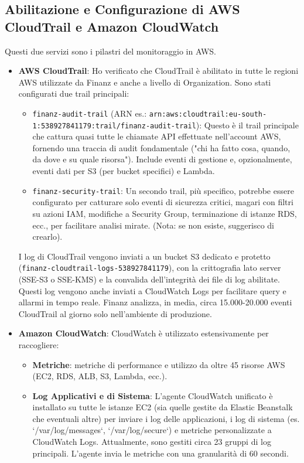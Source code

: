 \subsection{Abilitazione e Configurazione di AWS CloudTrail e Amazon CloudWatch}
\label{subsec:cloudtrail-cloudwatch-enable_cap2}
Questi due servizi sono i pilastri del monitoraggio in AWS.
\begin{itemize}
    \item \textbf{AWS CloudTrail}: Ho verificato che CloudTrail è abilitato in tutte le regioni AWS utilizzate da Finanz e anche a livello di Organization. Sono stati configurati due trail principali:
        \begin{itemize}
            \item \texttt{finanz-audit-trail} (ARN es.: \texttt{arn:aws:cloudtrail:eu-south-1:538927841179:trail/finanz-audit-trail}): Questo è il trail principale che cattura quasi tutte le chiamate API effettuate nell'account AWS, fornendo una traccia di audit fondamentale ("chi ha fatto cosa, quando, da dove e su quale risorsa"). Include eventi di gestione e, opzionalmente, eventi dati per S3 (per bucket specifici) e Lambda.
            \item \texttt{finanz-security-trail}: Un secondo trail, più specifico, potrebbe essere configurato per catturare solo eventi di sicurezza critici, magari con filtri su azioni IAM, modifiche a Security Group, terminazione di istanze RDS, ecc., per facilitare analisi mirate. (Nota: se non esiste, suggerisco di crearlo).
        \end{itemize}
        I log di CloudTrail vengono inviati a un bucket S3 dedicato e protetto (\texttt{finanz-cloudtrail-logs-538927841179}), con la crittografia lato server (SSE-S3 o SSE-KMS) e la convalida dell'integrità dei file di log abilitate. Questi log vengono anche inviati a CloudWatch Logs per facilitare query e allarmi in tempo reale. Finanz analizza, in media, circa 15.000-20.000 eventi CloudTrail al giorno solo nell'ambiente di produzione.
    \item \textbf{Amazon CloudWatch}: CloudWatch è utilizzato estensivamente per raccogliere:
        \begin{itemize}
            \item \textbf{Metriche}: metriche di performance e utilizzo da oltre 45 risorse AWS (EC2, RDS, ALB, S3, Lambda, ecc.).
            \item \textbf{Log Applicativi e di Sistema}: L'agente CloudWatch unificato è installato su tutte le istanze EC2 (sia quelle gestite da Elastic Beanstalk che eventuali altre) per inviare i log delle applicazioni, i log di sistema (es. `/var/log/messages`, `/var/log/secure`) e metriche personalizzate a CloudWatch Logs. Attualmente, sono gestiti circa 23 gruppi di log principali. L'agente invia le metriche con una granularità di 60 secondi.

\end{itemize}
\end{itemize}
